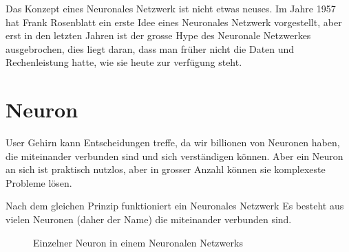 \documentclass[12pt,a4paper]{report}
\begin{document}
Das Konzept eines Neuronales Netzwerk ist nicht etwas neuses.
Im Jahre 1957 hat Frank Rosenblatt ein erste Idee eines Neuronales Netzwerk vorgestellt, aber erst in den letzten
Jahren ist der grosse Hype des Neuronale Netzwerkes ausgebrochen, dies liegt daran, dass man früher nicht die Daten
und Rechenleistung hatte, wie sie heute zur verfügung steht.

\section{Neuron}
User Gehirn kann Entscheidungen treffe, da wir billionen von Neuronen haben, die miteinander verbunden sind und sich
verständigen können.
Aber ein Neuron an sich ist praktisch nutzlos, aber in grosser Anzahl können sie komplexeste Probleme lösen.

Nach dem gleichen Prinzip funktioniert ein Neuronales Netzwerk
Es besteht aus vielen Neuronen (daher der Name) die miteinander verbunden sind.


\begin{figure}[!h]
    \centering
{}
    \caption{Einzelner Neuron in einem Neuronalen Netzwerks}
    \label{fig:neuron1}
\end{figure}
\end{document}
